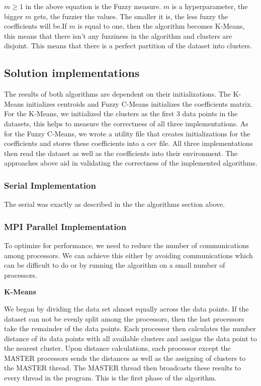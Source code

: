 \begin{multicols*}{2}
    $m \geq 1$ in the above equation is the Fuzzy measure. $m$ is a hyperparameter, the bigger $m$ gets, the fuzzier the values. The smaller it is, the less fuzzy the coefficients will be.If $m$ is equal to one, then the algorithm becomes K-Means, this means that there isn't any fuzziness in the algorithm and clusters are disjoint. This means that there is a perfect partition of the dataset into clusters.

    \subsection{Solution implementations}
    The results of both algorithms are dependent on their initializations. The K-Means initializes centroids and Fuzzy C-Means initializes the coefficients matrix. For the K-Means, we initialized the clusters as the first 3 data points in the datasets, this helps to measure the correctness of all three implementations. As for the Fuzzy C-Means, we wrote a utility file that creates initializations for the coefficients and stores these coefficients into a csv file. All three implementations then read the dataset as well as the coefficients into their environment. The approaches above aid in validating the correctness of the implemented algorithms.

    \subsubsection{Serial Implementation}
    The serial was exactly as described in the the algorithms section above. 

    \subsubsection{MPI Parallel Implementation}
    To optimize for performance, we need to reduce the number of communications among processors. We can achieve this either by avoiding communications which can be difficult to do or by running the algorithm on a small number of processors.
    
    \textbf{K-Means}

    We began by dividing the data set almost equally across the data points. If the dataset can not be evenly split among the processors, then the last processors take the remainder of the data points. Each processor then calculates the number distance of its data points with all available clusters and assigns the data point to the nearest cluster. Upon distance calculations, each processor except the MASTER processors sends the distances as well as the assigning of clusters to the MASTER thread. The MASTER thread then broadcasts these results to every thread in the program. This is the first phase of the algorithm. 


\end{multicols*}
